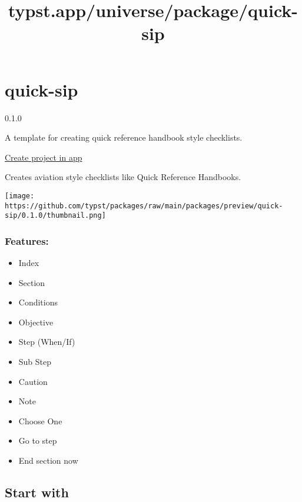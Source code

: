 \title{typst.app/universe/package/quick-sip}

\label{banner}
\label{template-thumbnail}

\section{quick-sip}\label{quick-sip}

{ 0.1.0 }

A template for creating quick reference handbook style checklists.

\href{/app?template=quick-sip&version=0.1.0}{Create project in app}

\label{readme}
Creates aviation style checklists like Quick Reference Handbooks.

\texttt{[image: https://github.com/typst/packages/raw/main/packages/preview/quick-sip/0.1.0/thumbnail.png]}

\subsubsection{Features:}\label{features}

\begin{itemize}
\tightlist
\item
  Index
\item
  Section
\item
  Conditions
\item
  Objective
\item
  Step (When/If)
\item
  Sub Step
\item
  Caution
\item
  Note
\item
  Choose One
\item
  Go to step
\item
  End section now
\end{itemize}

\subsection{Start with}\label{start-with}

\begin{Shaded}
\begin{Highlighting}[]
\end{Highlighting}
\end{Shaded}

